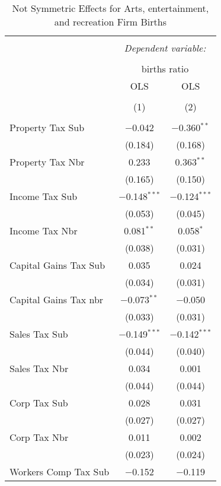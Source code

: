 
\begin{table}[!htbp] \centering 
  \caption{Not Symmetric Effects for  Arts, entertainment, and recreation Firm Births} 
  \label{71noequality} 
\begin{tabular}{@{\extracolsep{5pt}}lcc} 
\\[-1.8ex]\hline 
\hline \\[-1.8ex] 
 & \multicolumn{2}{c}{\textit{Dependent variable:}} \\ 
\cline{2-3} 
\\[-1.8ex] & \multicolumn{2}{c}{births ratio} \\ 
 & OLS & OLS \\ 
\\[-1.8ex] & (1) & (2)\\ 
\hline \\[-1.8ex] 
 Property Tax Sub & $-$0.042 & $-$0.360$^{**}$ \\ 
  & (0.184) & (0.168) \\ 
  Property Tax Nbr & 0.233 & 0.363$^{**}$ \\ 
  & (0.165) & (0.150) \\ 
  Income Tax Sub & $-$0.148$^{***}$ & $-$0.124$^{***}$ \\ 
  & (0.053) & (0.045) \\ 
  Income Tax Nbr & 0.081$^{**}$ & 0.058$^{*}$ \\ 
  & (0.038) & (0.031) \\ 
  Capital Gains Tax Sub & 0.035 & 0.024 \\ 
  & (0.034) & (0.031) \\ 
  Capital Gains Tax nbr & $-$0.073$^{**}$ & $-$0.050 \\ 
  & (0.033) & (0.031) \\ 
  Sales Tax Sub & $-$0.149$^{***}$ & $-$0.142$^{***}$ \\ 
  & (0.044) & (0.040) \\ 
  Sales Tax Nbr & 0.034 & 0.001 \\ 
  & (0.044) & (0.044) \\ 
  Corp Tax Sub & 0.028 & 0.031 \\ 
  & (0.027) & (0.027) \\ 
  Corp Tax Nbr & 0.011 & 0.002 \\ 
  & (0.023) & (0.024) \\ 
  Workers Comp Tax Sub & $-$0.152 & $-$0.119 \\ 

\end{tabular}
\end{table}
